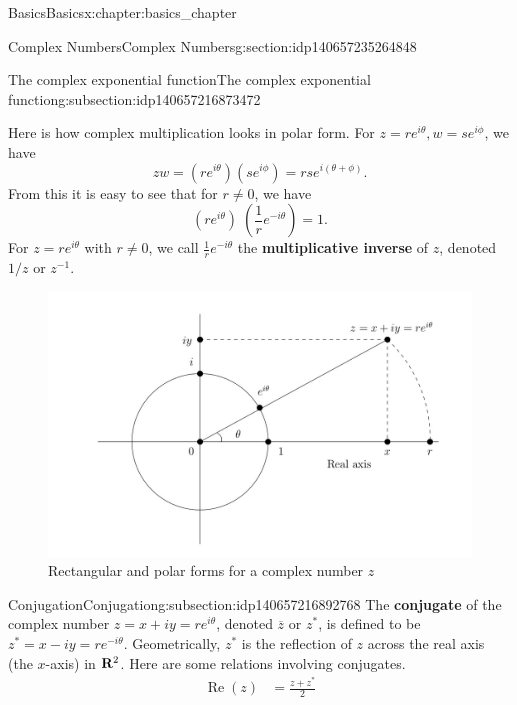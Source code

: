 \documentclass[oneside,10pt,]{book}
\newcommand{\terminology}[1]{\textbf{#1}}
\numberwithin{equation}{section}
\DeclareMathOperator{\re}{Re}
\newcommand{\R}{{\rm \bf R}}
\newcommand{\amp}{&}
\begin{document}
\begin{chapterptx}{Basics}{}{Basics}{}{}{x:chapter:basics_chapter}
\begin{sectionptx}{Complex Numbers}{}{Complex Numbers}{}{}{g:section:idp140657235264848}
\begin{subsectionptx}{The complex exponential function}{}{The complex exponential function}{}{}{g:subsection:idp140657216873472}
\par
Here is how complex multiplication looks in polar form. For \(z=re^{i\theta},
w=se^{i\phi}\), we have%
\begin{equation}
zw = (re^{i\theta})(se^{i\phi}) = rse^{i(\theta + \phi)}.\label{x:men:complexmultpolar}
\end{equation}
From this it is easy to see that for \(r\neq 0\), we have%
\begin{equation*}
\left(re^{i\theta}\right)\; \left(\frac{1}{r}e^{-i\theta}\right) = 1.
\end{equation*}
For \(z=re^{i\theta}\) with \(r\neq 0\), we call \(\frac{1}{r}e^{-i\theta}\) the \terminology{multiplicative inverse} of \(z\), denoted \({1}/{z}\) or \(z^{-1}\).%
\begin{figure}
\centering
\includegraphics[width=1\linewidth]{images/zxyrtheta_clip.jpg}
\caption{Rectangular and polar forms for a complex number  \(z\)\label{x:figure:zxyrthetafig}}
\end{figure}
\end{subsectionptx}
%
%
\typeout{************************************************}
\typeout{************************************************}
%
\begin{subsectionptx}{Conjugation}{}{Conjugation}{}{}{g:subsection:idp140657216892768}
The \terminology{conjugate} of the complex number \(z=x+iy=re^{i\theta}\), denoted \(\overline{z}\) or \(z^\ast\), is defined to be \(z^\ast = x-iy =
re^{-i\theta}\). Geometrically, \(z^\ast\) is the reflection of \(z\) across the real axis (the \(x\)-axis) in \(\R^2\). Here are some relations involving conjugates.%
\begin{align}
\re(z) \amp = \frac{z + z^\ast}{2}\label{x:mrow:realpartformula}\\

\end{align}
\end{subsectionptx}
\end{sectionptx}
\end{chapterptx}
\end{document}

